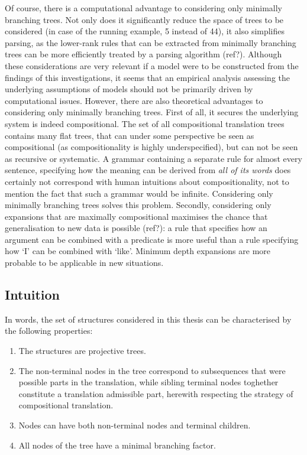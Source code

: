 \documentclass{report}
\theoremstyle{definition}
\theoremstyle{plain}
\begin{document}
Of course, there is a computational advantage to considering only minimally branching trees. Not only does it significantly reduce the space of trees to be considered (in case of the running example, 5 instead of 44), it also simplifies parsing, as the lower-rank rules that can be extracted from minimally branching trees  can be more efficiently treated by a parsing algorithm (ref?). Although these considerations are very relevant if a model were to be constructed from the
findings of this investigations, it seems that an empirical analysis assessing the underlying assumptions of models should not be primarily driven by computational issues. However, there are also theoretical advantages to considering only minimally branching trees. First of all, it secures the underlying system is indeed compositional. The set of all compositional translation trees contains many flat trees, that can under some perspective be seen as compositional (as compositionality is highly underspecified), but can not be seen as recursive or systematic. A grammar containing a separate rule for almost every sentence, specifying how the meaning can be derived from \textit{all of its words} does certainly not correspond with human intuitions about compositionality, not to mention the fact that such a grammar would be infinite. Considering only minimally branching trees solves this problem. Secondly, considering only expansions that are maximally compositional maximises the chance that generalisation to new data is possible (ref?): a rule that specifies how an argument can be combined with a predicate is more useful than a rule specifying how `I' can be combined with `like'. Minimum depth expansions are more probable to be applicable in new situations.

\subsection{Intuition}
\label{subsec:intuition}

In words, the set of structures considered in this thesis can be characterised by the following properties:
\begin{enumerate}
\item The structures are projective trees.
\item The non-terminal nodes in the tree correspond to subsequences that were possible parts in the translation, while sibling terminal nodes toghether constitute a translation admissible part, herewith respecting the strategy of compositional translation.
\item Nodes can have both non-terminal nodes and terminal children.
\item All nodes of the tree have a minimal branching factor.
\end{enumerate}
\end{document}
